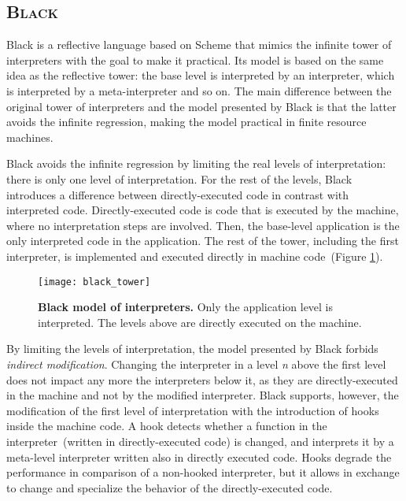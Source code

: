 \subsection*{\textsc{Black}}

Black is a reflective language based on Scheme that mimics the infinite tower of interpreters with the goal to make it practical. Its model is based on the same idea as the reflective tower: the base level is interpreted by an interpreter, which is interpreted by a meta-interpreter and so on. The main difference between the original tower of interpreters and the model presented by Black is that the latter avoids the infinite regression, making the model practical in finite resource machines.

Black avoids the infinite regression by limiting the real levels of interpretation: there is only one level of interpretation. For the rest of the levels, Black  introduces a difference between directly-executed code in contrast with interpreted code. Directly-executed code is code that is executed by the machine, where no interpretation steps are involved. Then, the base-level application is the only interpreted code in the application. The rest of the tower, including the first interpreter, is implemented and executed directly in machine code~(Figure \ref{fig:black_tower}).

\begin{figure}[ht]
\begin{center}
\texttt{[image: black\_tower]}
\caption{\textbf{Black model of interpreters.} Only the application level is interpreted. The levels above are directly executed on the machine.\label{fig:black_tower}
 }
\end{center}
\end{figure}

By limiting the levels of interpretation, the model presented by Black forbids \emph{indirect modification}. Changing the interpreter in a level \emph{n} above the first level does not impact any more the interpreters below it, as they are directly-executed in the machine and not by the modified interpreter. Black supports, however, the modification of the first level of interpretation with the introduction of hooks inside the machine code. A hook detects whether a function in the interpreter~(written in directly-executed code) is changed, and interprets it by a meta-level interpreter written also in directly executed code. Hooks degrade the performance in comparison of a non-hooked interpreter, but it allows in exchange to change and specialize the behavior of the directly-executed code.

